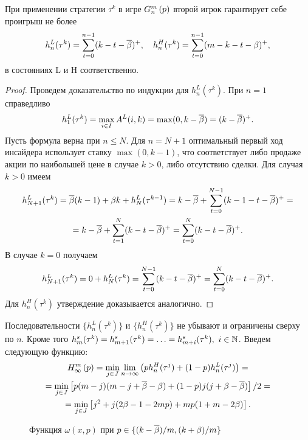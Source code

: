 {\begin{proposition}
  \label{ch1:prop:secondPlayerStrategyPayoffs}
  При применении стратегии $\tau^k$ в игре $G_{n}^m\left({p}\right)$ второй игрок гарантирует себе проигрыш не более
  \[
    h_n^L(\tau^k) = \sum_{t=0}^{n-1}(k - t - {\overline{\beta}})^+, \quad h_n^H(\tau^k) =
    \sum_{t=0}^{n-1}(m - k - t - \beta)^+,
  \]
  в состояниях L и H соответственно.
\end{proposition}
\begin{proof}
  Проведем доказательство по индукции для $h^L_n(\tau^k)$.
  При $n=1$ справедливо
  \[
    h^L_1(\tau^k) = \max_{i \in I} A^L(i, k) = \max(0, k - {\overline{\beta}}) = (k - {\overline{\beta}})^+.
  \]
  Пусть формула верна при $n \leq N$. Для $n=N+1$ оптимальный первый ход инсайдера использует ставку $\max(0, k - 1)$, что соответствует либо продаже
  акции по наибольшей цене в случае $k > 0$, либо отсутствию сделки. 
  Для случая $k > 0$ имеем
  \begin{gather*}
    h^L_{N+1}(\tau^k) = {\overline{\beta}} (k-1) + \beta k + h^L_N(\tau^{k-1}) =
    k - {\overline{\beta}} + \sum_{t=0}^{N-1}(k - 1 - t - {\overline{\beta}})^+ = \\
    = k - {\overline{\beta}} + \sum_{t=1}^N(k-t-{\overline{\beta}})^+ = \sum_{t=0}^N(k-t-{\overline{\beta}})^+.
  \end{gather*}
  В случае $k = 0$ получаем
  \begin{gather*}
    h^L_{N+1}(\tau^k) = 0 + h^L_N(\tau^k) = \sum_{t=0}^{N-1}(k-t-{\overline{\beta}})^+ = \sum_{t=0}^N(k-t-{\overline{\beta}})^+.
  \end{gather*}
  Для $h^H_n(\tau^k)$ утверждение доказывается аналогично.
\end{proof}

Последовательности $\{h_n^L(\tau^k)\}$ и $\{h_n^H(\tau^k)\}$ не убывают и ограничены сверху по $n$.
Кроме того
$h^s_m(\tau^k) = h^s_{m+1}(\tau^k) = \ldots = h^s_{m+i}(\tau^k),\ i \in \mathbb{N}$.
Введем следующую функцию:
\begin{multline*}
  H_{\infty}^m\left({p}\right) 
  = \min_{j \in J} \lim_{n \rightarrow \infty}\left(
    ph_n^H(\tau^j) + (1-p)h_n^L(\tau^j)
  \right) = \\
  = \min_{j \in J} \left[ p (m - j)(m - j + {\overline{\beta}} - \beta) + (1 - p)j(j + \beta
    - {\overline{\beta}}) \right] / 2 = \\
  = \min_{j \in J} \left[ j^2 + j(2\beta - 1 - 2 m p) + m p (1 + m - 2\beta) \right].
\end{multline*}

\begin{figure}[b]
  \centering
  
  \caption{Функция $\omega(x,p)$ при $p \in \{(k-{\overline{\beta}})/m, (k+\beta)/m\}$}
  \label{ch1:fig:omega(x,p)}
\end{figure}

}
